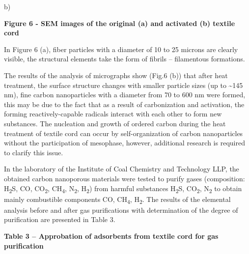 b)

\textbf{Figure 6 - SEM images of the original (a) and activated (b)
textile cord}

In Figure 6 (a), fiber particles with a diameter of 10 to 25 microns are
clearly visible, the structural elements take the form of fibrils --
filamentous formations.

The results of the analysis of micrographs show (Fig.6 (b)) that after
heat treatment, the surface structure changes with smaller particle
sizes (up to \textasciitilde145 nm), fine carbon nanoparticles with a
diameter from 70 to 600 nm were formed, this may be due to the fact that
as a result of carbonization and activation, the forming
reactively-capable radicals interact with each other to form new
substances. The nucleation and growth of ordered carbon during the heat
treatment of textile cord can occur by self-organization of carbon
nanoparticles without the participation of mesophase, however,
additional research is required to clarify this issue.

In the laboratory of the Institute of Coal Chemistry and Technology LLP,
the obtained carbon nanoporous materials were tested to purify gases
(composition: H\textsubscript{2}S, CO, CO\textsubscript{2},
CH\textsubscript{4}, N\textsubscript{2}, H\textsubscript{2}) from
harmful substances H\textsubscript{2}S, CO\textsubscript{2},
N\textsubscript{2} to obtain mainly combustible components CO,
CH\textsubscript{4}, H\textsubscript{2}. The results of the elemental
analysis before and after gas purifications with determination of the
degree of purification are presented in Table 3.

\textbf{Table 3 -- Approbation of adsorbents from textile cord for gas
purification}

